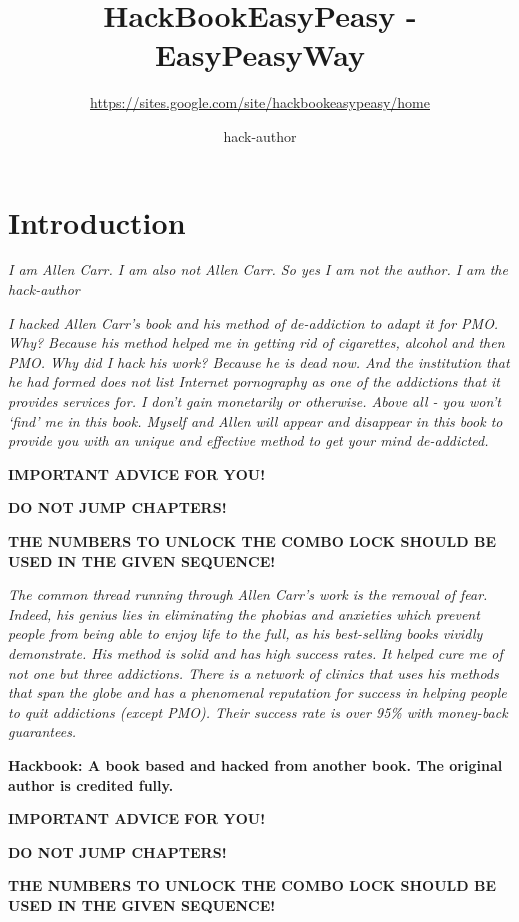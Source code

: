 \documentclass[
]{book}
\title{HackBookEasyPeasy - EasyPeasyWay}
\subtitle{\url{https://sites.google.com/site/hackbookeasypeasy/home}}
\author{hack-author}
\date{}
\begin{document}
\maketitle

{
\setcounter{tocdepth}{1}
\tableofcontents
}
\hypertarget{introduction}{%
\chapter*{Introduction}\label{introduction}}

\emph{I am Allen Carr. I am also not Allen Carr. So yes I am not the author. I am the hack-author}

\emph{I hacked Allen Carr's book and his method of de-addiction to adapt it for PMO. Why? Because his method helped me in getting rid of cigarettes, alcohol and then PMO. Why did I hack his work? Because he is dead now. And the institution that he had formed does not list Internet pornography as one of the addictions that it provides services for. I don't gain monetarily or otherwise. Above all - you won't `find' me in this book. Myself and Allen will appear and disappear in this book to provide you with an unique and effective method to get your mind de-addicted.}

\textbf{IMPORTANT ADVICE FOR YOU!}

\textbf{DO NOT JUMP CHAPTERS!}

\textbf{THE NUMBERS TO UNLOCK THE COMBO LOCK SHOULD BE USED IN THE GIVEN SEQUENCE!}

\emph{The common thread running through Allen Carr's work is the removal of fear. Indeed, his genius lies in eliminating the phobias and anxieties which prevent people from being able to enjoy life to the full, as his best-selling books vividly demonstrate. His method is solid and has high success rates. It helped cure me of not one but three addictions. There is a network of clinics that uses his methods that span the globe and has a phenomenal reputation for success in helping people to quit addictions (except PMO). Their success rate is over 95\% with money-back guarantees.}

\textbf{Hackbook: A book based and hacked from another book. The original author is credited fully.}

\textbf{IMPORTANT ADVICE FOR YOU!}

\textbf{DO NOT JUMP CHAPTERS!}

\textbf{THE NUMBERS TO UNLOCK THE COMBO LOCK SHOULD BE USED IN THE GIVEN SEQUENCE!}
\end{document}

